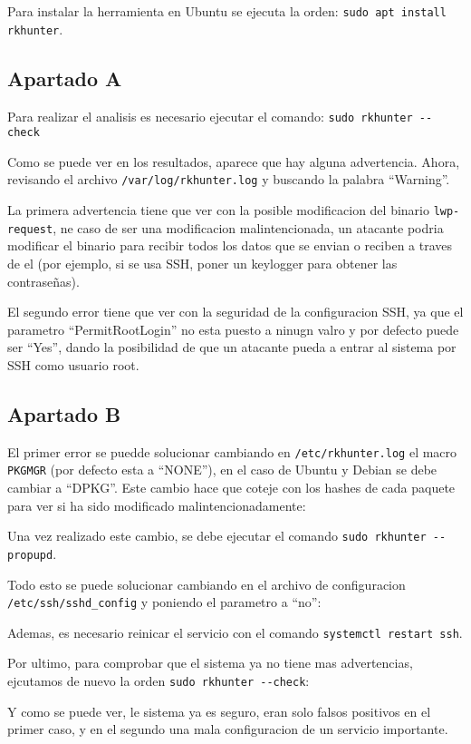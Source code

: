 \documentclass{article}
\begin{document}
Para instalar la herramienta en Ubuntu se ejecuta la orden: \verb|sudo apt install rkhunter|.

\subsection*{Apartado A}
Para realizar el analisis es necesario ejecutar el comando: \verb|sudo rkhunter --check|


Como se puede ver en los resultados, aparece que hay alguna advertencia. Ahora, revisando el archivo \verb|/var/log/rkhunter.log| y buscando la palabra ``Warning''.


La primera advertencia tiene que ver con la posible modificacion del binario \verb|lwp-request|, ne caso de ser una modificacion malintencionada, un atacante podria modificar el binario para recibir todos los datos que se envian o reciben a traves de el (por ejemplo, si se usa SSH, poner un keylogger para obtener las contraseñas).

El segundo error tiene que ver con la seguridad de la configuracion SSH, ya que el parametro ``PermitRootLogin'' no esta puesto a ninugn valro y por defecto puede ser ``Yes'', dando la posibilidad de que un atacante pueda a entrar al sistema por SSH como usuario root.


\subsection*{Apartado B}
El primer error se puedde solucionar cambiando en \verb|/etc/rkhunter.log| el macro \verb|PKGMGR| (por defecto esta a ``NONE''), en el caso de Ubuntu y Debian se debe cambiar a ``DPKG''. Este cambio hace que coteje con los hashes de cada paquete para ver si ha sido modificado malintencionadamente:


Una vez realizado este cambio, se debe ejecutar el comando \verb|sudo rkhunter --propupd|.


Todo esto se puede solucionar cambiando en el archivo de configuracion \verb|/etc/ssh/sshd_config| y poniendo el parametro a ``no'':


Ademas, es necesario reinicar el servicio con el comando \verb|systemctl restart ssh|.

Por ultimo, para comprobar que el sistema ya no tiene mas advertencias, ejcutamos de nuevo la orden \verb|sudo rkhunter --check|:


Y como se puede ver, le sistema ya es seguro, eran solo falsos positivos en el primer caso, y en el segundo una mala configuracion de un servicio importante.
\end{document}
